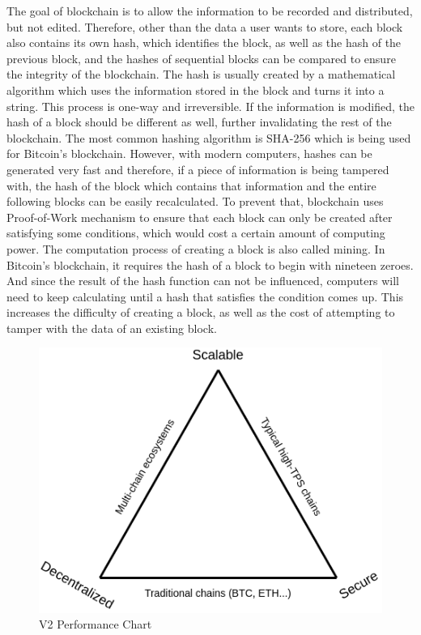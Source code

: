 The goal of blockchain is to allow the information to be recorded and distributed, but not edited. Therefore, other than the data a user wants to store, each block also contains its own hash, which identifies the block, as well as the hash of the previous block, and the hashes of sequential blocks can be compared to ensure the integrity of the blockchain. The hash is usually created by a mathematical algorithm which uses the information stored in the block and turns it into a string. This process is one-way and irreversible. If the information is modified, the hash of a block should be different as well, further invalidating the rest of the blockchain. The most common hashing algorithm is SHA-256 which is being used for Bitcoin’s blockchain. However, with modern computers, hashes can be generated very fast and therefore, if a piece of information is being tampered with, the hash of the block which contains that information and the entire following blocks can be easily recalculated. To prevent that, blockchain uses Proof-of-Work mechanism to ensure that each block can only be created after satisfying some conditions, which would cost a certain amount of computing power. The computation process of creating a block is also called mining. In Bitcoin’s blockchain, it requires the hash of a block to begin with nineteen zeroes. And since the result of the hash function can not be influenced, computers will need to keep calculating until a hash that satisfies the condition comes up. This increases the difficulty of creating a block, as well as the cost of attempting to tamper with the data of an existing block.

\begin{figure}[!ht]
   \centering
   \includegraphics[width=120mm]{fig/trilemma.png}
   \caption{V2 Performance Chart}
\end{figure}

